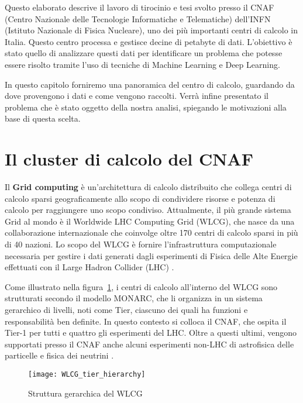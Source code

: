 Questo elaborato descrive il lavoro di tirocinio e tesi svolto presso il CNAF
(Centro Nazionale delle Tecnologie Informatiche e Telematiche) dell'INFN
(Istituto Nazionale di Fisica Nucleare), uno dei più importanti centri di
calcolo in Italia. Questo centro processa e gestisce decine di petabyte di
dati. L'obiettivo è stato quello di analizzare questi dati per identificare un
problema che potesse essere risolto tramite l'uso di tecniche di Machine
Learning e Deep Learning.

In questo capitolo forniremo una panoramica del centro di calcolo, guardando
da dove provengono i dati e come vengono raccolti. Verrà infine presentato il
problema che è stato oggetto della nostra analisi, spiegando le motivazioni
alla base di questa scelta.

\section{Il cluster di calcolo del CNAF}

Il \textbf{Grid computing} è un'architettura di calcolo distribuito che
collega centri di calcolo sparsi geograficamente allo scopo di condividere
risorse e potenza di calcolo per raggiungere uno scopo condiviso. Attualmente,
il più grande sistema Grid al mondo è il Worldwide LHC Computing Grid (WLCG),
che nasce da una collaborazione internazionale che coinvolge oltre 170 centri
di calcolo sparsi in più di 40 nazioni. Lo scopo del WLCG è fornire
l'infrastruttura computazionale necessaria per gestire i dati generati dagli
esperimenti di Fisica delle Alte Energie effettuati con il Large Hadron
Collider (LHC) \cite{WLCG2023}.

Come illustrato nella figura~\ref{fig:WLCG_tier_hierarchy}, i centri di
calcolo all'interno del WLCG sono strutturati secondo il modello MONARC, che
li organizza in un sistema gerarchico di livelli, noti come Tier, ciascuno dei
quali ha funzioni e responsabilità ben definite. In questo contesto si colloca
il CNAF, che ospita il Tier-1 per tutti e quattro gli esperimenti del LHC.
Oltre a questi ultimi, vengono supportati presso il CNAF anche alcuni
esperimenti non-LHC di astrofisica delle particelle e fisica dei neutrini
\cite{Bortolotti2012}.

\begin{figure}[ht]
    \centering
    \texttt{[image: WLCG\_tier\_hierarchy]}
    \caption{Struttura gerarchica del WLCG \protect\cite{dalpra2019}}
    \label{fig:WLCG_tier_hierarchy}
\end{figure}

